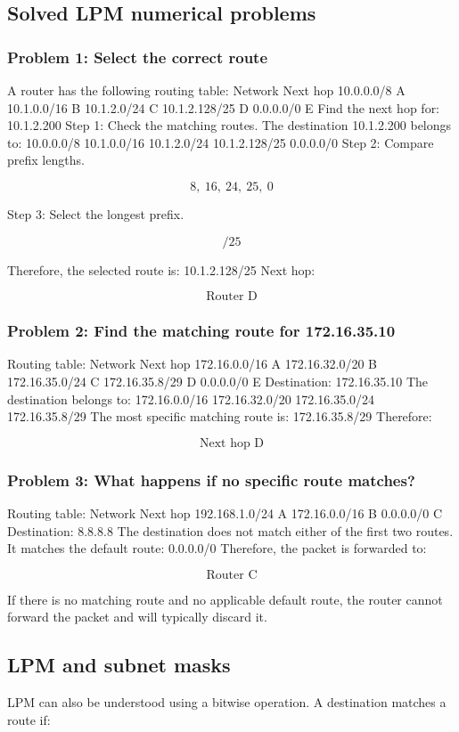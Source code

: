 \subsection{Solved LPM numerical problems}
\subsubsection*{Problem 1: Select the correct route}
A router has the following routing table:
Network
Next hop
10.0.0.0/8
A
10.1.0.0/16
B
10.1.2.0/24
C
10.1.2.128/25
D
0.0.0.0/0
E
Find the next hop for:
10.1.2.200
Step 1: Check the matching routes.
The destination 10.1.2.200 belongs to:
10.0.0.0/8
10.1.0.0/16
10.1.2.0/24
10.1.2.128/25
0.0.0.0/0
Step 2: Compare prefix lengths.

\[
8,\ 16,\ 24,\ 25,\ 0
\]

Step 3: Select the longest prefix.

\[
\boxed{/25}
\]

Therefore, the selected route is:
10.1.2.128/25
Next hop:

\[
\boxed{\text{Router D}}
\]

\subsubsection*{Problem 2: Find the matching route for 172.16.35.10}
Routing table:
Network
Next hop
172.16.0.0/16
A
172.16.32.0/20
B
172.16.35.0/24
C
172.16.35.8/29
D
0.0.0.0/0
E
Destination:
172.16.35.10
The destination belongs to:
172.16.0.0/16
172.16.32.0/20
172.16.35.0/24
172.16.35.8/29
The most specific matching route is:
172.16.35.8/29
Therefore:

\[
\boxed{\text{Next hop D}}
\]

\subsubsection*{Problem 3: What happens if no specific route matches?}
Routing table:
Network
Next hop
192.168.1.0/24
A
172.16.0.0/16
B
0.0.0.0/0
C
Destination:
8.8.8.8
The destination does not match either of the first two routes.
It matches the default route:
0.0.0.0/0
Therefore, the packet is forwarded to:

\[
\boxed{\text{Router C}}
\]

If there is no matching route and no applicable default route, the router cannot forward the packet and will typically discard it.
\subsection{LPM and subnet masks}
LPM can also be understood using a bitwise operation.
A destination matches a route if:

